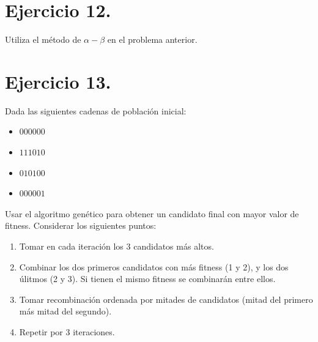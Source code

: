 \documentclass[12pt,letterpaper]{article}
\begin{document}
\bigskip



\newpage


\section{Ejercicio 12.}
Utiliza el método de $\alpha - \beta$ en el problema anterior.


\bigskip



\newpage


\section{Ejercicio 13.}
Dada las siguientes cadenas de población inicial:

\begin{itemize}
\item $000000$
\item $111010$
\item $010100$
\item $000001$
\end{itemize}

Usar el algoritmo genético para obtener un candidato final con mayor valor de fitness. Considerar los siguientes puntos:

\begin{enumerate}
\item[a)] Tomar en cada iteración los $3$ candidatos más altos.
\item[b)] Combinar los dos primeros candidatos con más fitness (1 y 2), y los dos úlitmos (2 y 3). Si tienen el mismo fitness se combinarán entre ellos.
\item[c)] Tomar recombinación ordenada por mitades de candidatos (mitad del primero más mitad del segundo).
\item[d)] Repetir por 3 iteraciones.
\end{enumerate}

\bigskip


\end{document}
